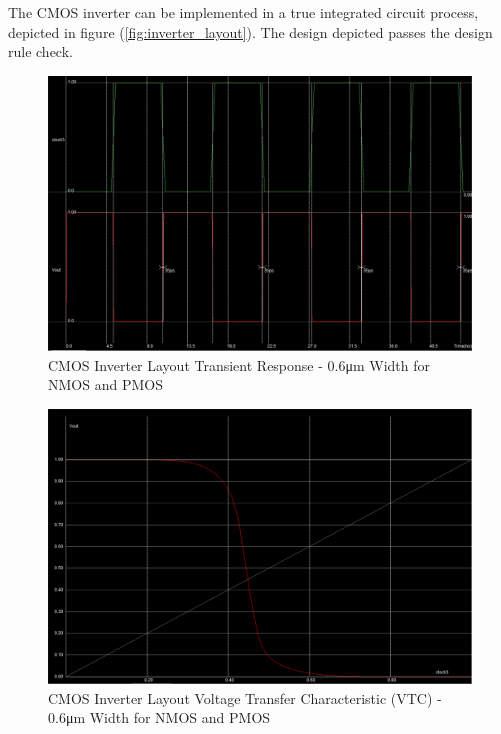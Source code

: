 \FloatBarrier

The CMOS inverter can be implemented in a true integrated circuit process, depicted in figure (\ref{fig:inverter_layout}).
The design depicted passes the design rule check.

\FloatBarrier

\begin{figure}[h!]
	\centering
	\includegraphics[scale=0.50]{./images/inverter_transient_06nmos_06pmos.PNG}
	\caption{CMOS Inverter Layout Transient Response - 0.6\si{\micro\meter} Width for NMOS and PMOS}
	\label{fig:cmos_layout_transient}
\end{figure}

\FloatBarrier

\FloatBarrier

\begin{figure}[h!]
	\centering
	\includegraphics[scale=0.50]{./images/inverter_vtc_06nmos_06pmos.PNG}
	\caption{CMOS Inverter Layout Voltage Transfer Characteristic (VTC) - 0.6\si{\micro\meter} Width for NMOS and PMOS}
	\label{fig:cmos_layout_vtc}
\end{figure}

